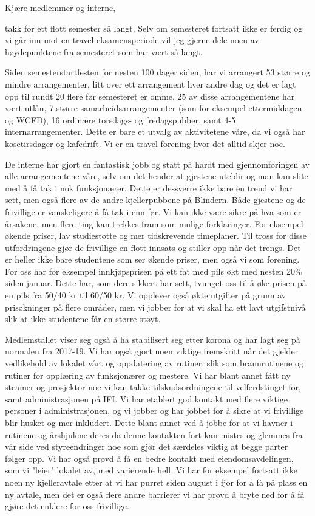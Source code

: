 \documentclass[10pt,norsk,a4paper,usenames,dvipsnames]{article}
\begin{document}
    \begin{multicols}{2}


    Kjære medlemmer og interne,

    takk for ett flott semester så langt. Selv om semesteret fortsatt ikke er ferdig og vi går inn mot en travel eksamensperiode vil jeg gjerne dele noen av høydepunktene fra semesteret som har vært så langt.

    Siden semesterstartfesten for nesten 100 dager siden, har vi arrangert 53 større og mindre arrangementer, litt over ett arrangement hver andre dag og det er lagt opp til rundt 20 flere før semesteret er omme. 25 av disse arrangementene har vært utlån, 7 større samarbeidsarrangementer (som for eksempel ettermiddagen og WCFD), 16 ordinære torsdags- og fredagspubber, samt 4-5 internarrangementer. Dette er bare et utvalg av aktivitetene våre, da vi også har kosetirsdager og kafedrift. Vi er en travel forening hvor det alltid skjer noe.

    De interne har gjort en fantastisk jobb og stått på hardt med gjennomføringen av alle arrangementene våre, selv om det hender at gjestene uteblir og man kan slite med å få tak i nok funksjonærer. Dette er dessverre ikke bare en trend vi har sett, men også flere av de andre kjellerpubbene på Blindern. Både gjestene og de frivillige er vanskeligere å få tak i enn før. Vi kan ikke være sikre på hva som er årsakene, men flere ting kan trekkes fram som mulige forklaringer. For eksempel økende priser, lav studiestøtte og mer tidskrevende timeplaner. Til tross for disse utfordringene gjør de frivillige en flott innsats og stiller opp når det trengs.
    Det er heller ikke bare studentene som ser økende priser, men også vi som forening. For oss har for eksempel innkjøpsprisen på ett fat med pils økt med nesten 20\% siden januar. Dette har, som dere sikkert har sett, tvunget oss til å øke prisen på en pils fra 50/40 kr til 60/50 kr. Vi opplever også økte utgifter på grunn av prisøkninger på flere områder, men vi jobber for at vi skal ha ett lavt utgifstnivå slik at ikke studentene får en større støyt.

    Medlemstallet viser seg også å ha stabilisert seg etter korona og har lagt seg på normalen fra 2017-19. Vi har også gjort noen viktige fremskritt når det gjelder vedlikehold av lokalet vårt og oppdatering av rutiner, slik som brannrutinene og rutiner for opplæring av funksjonærer og mestere. Vi har blant annet fått ny steamer og prosjektor noe vi kan takke tilskudsordningene til velferdstinget for, samt administrasjonen på IFI.
    Vi har etablert god kontakt med flere viktige personer i administrasjonen, og vi jobber og har jobbet for å sikre at vi frivillige blir husket og mer inkludert. Dette blant annet ved å jobbe for at vi havner i rutinene og årshjulene deres da denne kontakten fort kan mistes og glemmes fra vår side ved styreendringer noe som gjør det særdeles viktig at begge parter følger opp. Vi har også prøvd å få en bedre kontakt med eiendomsavdelingen, som vi "leier" lokalet av, med varierende hell. Vi har for eksempel fortsatt ikke noen ny kjelleravtale etter at vi har purret siden august i fjor for å få på plass en ny avtale, men det er også flere andre barrierer vi har prøvd å bryte ned for å få gjøre det enklere for oss frivillige.


\end{multicols}
\end{document}
